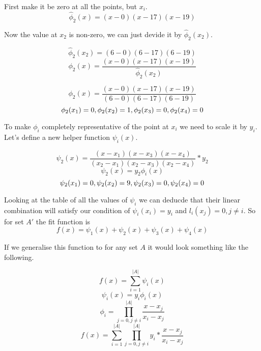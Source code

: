 \documentclass[12pt, titlepage]{article}
\begin{document}
First make it be zero at all the points, but $x_i$.
\begin{equation}
    \hat{\phi}_2(x) = (x - 0)(x - 17)(x - 19)
\end{equation}

Now the value at $x_2$ is non-zero, we can just devide it by $\hat{\phi}_2(x_2)$.

\begin{equation}
    \hat{\phi}_2(x_2) = (6 - 0)(6 - 17)(6 - 19)
\end{equation}
\begin{equation}
    \phi_2(x) = \frac{(x - 0)(x - 17)(x - 19)}{\hat{\phi}_2(x_2)}
\end{equation}

\begin{equation}
    \phi_2(x) = \frac{(x - 0)(x - 17)(x - 19)}{(6 - 0)(6 - 17)(6 - 19)}
\end{equation}
$$\phi_2(x_1) = 0, \phi_2(x_2) = 1\\,\phi_2(x_3) = 0\\, \phi_2(x_4) = 0\\$$

To make $\phi_i$ completely representative of the point at $x_i$ we need to 
scale it by $y_i$. Let's define a new helper function $\psi_i(x)$.

\begin{equation}
    \psi_2(x) = \frac{(x - x_1)(x - x_3)(x - x_4)}{(x_2 - x_1)(x_2 - x_3)(x_2 - x_4)} * y_2
\end{equation}
\begin{equation}
    \psi_2(x) = y_2 \phi_i(x)
\end{equation}
$$\psi_2(x_1) = 0, \psi_2(x_2) = 9\\,\psi_2(x_3) = 0\\, \psi_2(x_4) = 0\\$$

Looking at the table of all the values of $\psi_i$ we can deducde that their linear
combination will satisfy our condition of $\psi_i(x_i) = y_i$ and 
$l_i(x_j) = 0, j \neq i$. So for set $A'$ the fit function is 
$$f(x) = \psi_1(x) + \psi_2(x) + \psi_3(x) + \psi_4(x)$$

If we generalise this function to for any set $A$ it would look something 
like the following.

$$f(x) = \sum_{i=1}^{|A|}\psi_i(x)$$
$$\psi_i(x) = y_i \phi_i(x)$$
\begin{equation}
    \phi_i = \prod_{j=0, j \neq i}^{|A|}\frac{x - x_j}{x_i - x_j}
\end{equation}
\begin{equation}
f(x) = \sum_{i=1}^{|A|} \prod_{j=0, j \neq i}^{|A|}y_i * \frac{x - x_j}{x_i - x_j}
\end{equation}
\end{document}
